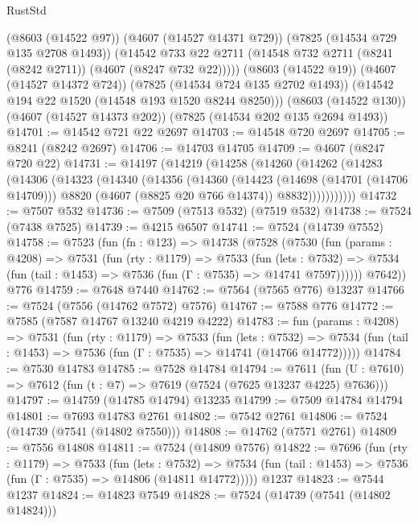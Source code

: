 \begin{lexlean}{RustStd}
\begin{coremodule}
        (@8603 (@14522 @97))
        (@4607 (@14527 @14371 @729))
        (@7825 (@14534 @729 @135 @2708 @1493))
        (@14542 @733 @22 @2711 (@14548 @732 @2711 (@8241 (@8242 @2711)) (@4607 (@8247 @732 @22)))))
      (@8603 (@14522 @19))
      (@4607 (@14527 @14372 @724))
      (@7825 (@14534 @724 @135 @2702 @1493))
      (@14542 @194 @22 @1520 (@14548 @193 @1520 @8244 @8250)))
    (@8603 (@14522 @130))
    (@4607 (@14527 @14373 @202))
    (@7825 (@14534 @202 @135 @2694 @1493))
@14701 := @14542 @721 @22 @2697
@14703 := @14548 @720 @2697
@14705 := @8241 (@8242 @2697)
@14706 := @14703 @14705
@14709 := @4607 (@8247 @720 @22)
@14731 := @14197
    (@14219
      (@14258
        (@14260
          (@14262
            (@14283
              (@14306
                (@14323
                  (@14340
                    (@14356
                      (@14360
                        (@14423
                          (@14698 (@14701 (@14706 @14709)))
                          @8820
                          (@4607 (@8825 @20 @766 @14374))
                          @8832)))))))))))
@14732 := @7507 @532
@14736 := @7509 (@7513 @532) (@7519 @532)
@14738 := @7524 (@7438 @7525)
@14739 := @4215 @6507
@14741 := @7524 (@14739 @7552)
@14758 := @7523
    (fun (fn : @123) =>
    @14738
      (@7528
        (@7530
          (fun (params : @4208) =>
          @7531
            (fun (rty : @1179) =>
            @7533
              (fun (lets : @7532) =>
              @7534 (fun (tail : @1453) => @7536 (fun (Γ : @7535) => @14741 @7597))))))
        @7642))
    @776
@14759 := @7648 @7440
@14762 := @7564 (@7565 @776) @13237
@14766 := @7524 (@7556 (@14762 @7572) @7576)
@14767 := @7588 @776
@14772 := @7585 (@7587 @14767 @13240 @4219 @4222)
@14783 := fun (params : @4208) =>
  @7531
    (fun (rty : @1179) =>
    @7533
      (fun (lets : @7532) =>
      @7534 (fun (tail : @1453) => @7536 (fun (Γ : @7535) => @14741 (@14766 @14772)))))
@14784 := @7530 @14783
@14785 := @7528 @14784
@14794 := @7611
    (fun (U : @7610) => @7612 (fun (t : @7) => @7619 (@7524 (@7625 @13237 @4225) @7636)))
@14797 := @14759 (@14785 @14794) @13235
@14799 := @7509 @14784 @14794
@14801 := @7693 @14783 @2761
@14802 := @7542 @2761
@14806 := @7524 (@14739 (@7541 (@14802 @7550)))
@14808 := @14762 (@7571 @2761)
@14809 := @7556 @14808
@14811 := @7524 (@14809 @7576)
@14822 := @7696
    (fun (rty : @1179) =>
    @7533
      (fun (lets : @7532) =>
      @7534 (fun (tail : @1453) => @7536 (fun (Γ : @7535) => @14806 (@14811 @14772)))))
    @1237
@14823 := @7544 @1237
@14824 := @14823 @7549
@14828 := @7524 (@14739 (@7541 (@14802 @14824)))

\end{coremodule}
\end{lexlean}
